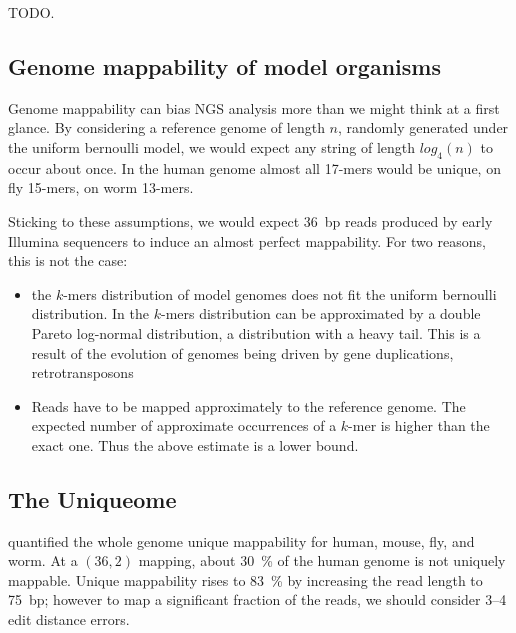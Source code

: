 TODO.


\subsection{Genome mappability of model organisms}

Genome mappability can bias NGS analysis more than we might think at a first glance.
By considering a reference genome of length $n$, randomly generated under the uniform bernoulli model, we would expect any string of length $log_4(n)$ to occur about once.
In the human genome almost all 17-mers would be unique, on fly 15-mers, on worm 13-mers.

Sticking to these assumptions, we would expect 36~bp reads produced by early Illumina sequencers to induce an almost perfect mappability. For two reasons, this is not the case:
\begin{itemize}
\item the $k$-mers distribution of model genomes does not fit the uniform bernoulli distribution.
In \citep{?} the $k$-mers distribution can be approximated by a double Pareto log-normal distribution, \ie a distribution with a heavy tail.
This is a result of the evolution of genomes being driven by gene duplications, retrotransposons \citep{?}

\item Reads have to be mapped approximately to the reference genome.
The expected number of approximate occurrences of a $k$-mer is higher than the exact one.
Thus the above estimate is a lower bound.
\end{itemize}


\subsection{The Uniqueome}

\citep{Derrien2012} quantified the whole genome unique mappability for human, mouse, fly, and worm.
At a $(36,2)$ mapping, about 30~\% of the human genome is not uniquely mappable.
Unique mappability rises to 83~\% by increasing the read length to 75~bp; however to map a significant fraction of the reads, we should consider 3--4 edit distance errors.

\begin{center}

\end{center}

